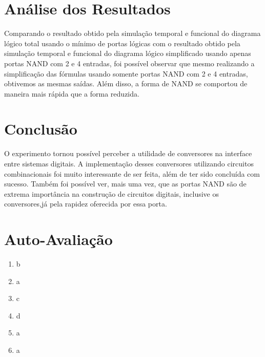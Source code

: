 \documentclass[12pt]{article}
\begin{document}
\section{Análise dos Resultados}
\label{sec:Resultados}


Comparando o resultado obtido pela simulação temporal e funcional do diagrama lógico total usando o mínimo de portas lógicas com o resultado obtido pela simulação temporal e funcional do diagrama lógico simplificado usando apenas portas NAND com 2 e 4 entradas, foi possível observar que mesmo realizando a simplificação das fórmulas usando somente portas NAND com 2 e 4 entradas, obtivemos as mesmas saídas. Além disso, a forma de NAND se comportou de maneira mais rápida que a forma reduzida.

\section{Conclusão}
\label{sec:Conclusao}

O experimento tornou possível perceber a utilidade de conversores na interface entre sistemas digitais. A implementação desses conversores utilizando circuitos combinacionais foi muito interessante de ser feita, além de ter sido concluída com sucesso. Também foi possível ver, mais uma vez, que as portas NAND são de extrema importância na construção de circuitos digitais, inclusive os conversores,já pela rapidez oferecida por essa porta.






\newpage 
\section*{Auto-Avaliação}

\begin{enumerate}
    \item b
    \item a
    \item c
    \item d
    \item a
    \item a
\end{enumerate}
\end{document}
